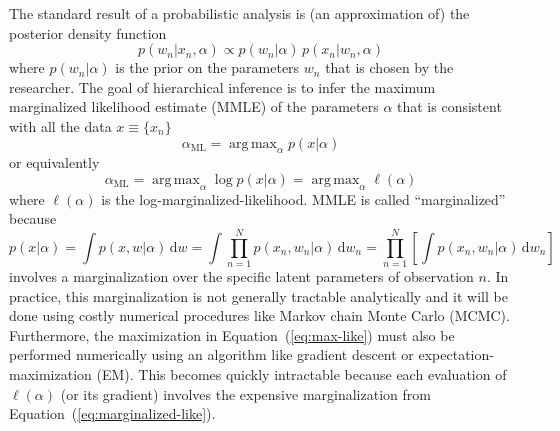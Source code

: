 \documentclass[12pt,preprint]{aastex}
\newcommand{\Eq}[1]{Equation~(\ref{eq:#1})}
\newcommand{\eq}[1]{\Eq{#1}}
\newcommand{\eqlabel}[1]{\label{eq:#1}}
\newcommand{\dd}{\,\mathrm{d}}
\newcommand{\pr}[1]{p ( #1 )}
\DeclareMathOperator*{\argmax}{arg\,max}
\begin{document}
The standard result of a probabilistic analysis is (an approximation of) the
posterior density function
\begin{equation}
    \pr{w_n | x_n, \alpha} \propto \pr{w_n | \alpha} \, \pr{x_n | w_n, \alpha}
\end{equation}
where $\pr{w_n | \alpha}$ is the prior on the parameters $w_n$ that is chosen
by the researcher. The goal of hierarchical inference is to infer the
maximum marginalized likelihood estimate (MMLE) of the parameters $\alpha$
that is consistent with all the data $x \equiv \{ x_n \}$
\begin{equation}
    \alpha_\mathrm{ML} = \argmax_\alpha \pr{x | \alpha}
\end{equation}
or equivalently
\begin{equation} \eqlabel{max-like}
    \alpha_\mathrm{ML} = \argmax_\alpha \log \pr{x | \alpha}
        = \argmax_\alpha \ell (\alpha)
\end{equation}
where $\ell (\alpha)$ is the log-marginalized-likelihood. MMLE is called
``marginalized'' because
\begin{equation} \eqlabel{marginalized-like}
    \pr{x | \alpha} = \int \pr{x, w | \alpha} \dd w
        = \int \prod_{n = 1} ^N  \pr{x_n, w_n | \alpha} \dd w_n
        = \prod_{n = 1} ^N \left [ \int \pr{x_n, w_n | \alpha} \dd w_n
            \right ]
\end{equation}
involves a marginalization over the specific latent parameters of observation
$n$. In practice, this marginalization is not generally tractable
analytically and it will be done using costly numerical procedures like
Markov chain Monte Carlo (MCMC). Furthermore, the maximization in
\eq{max-like} must also be performed numerically using an algorithm like
gradient descent or expectation-maximization (EM). This becomes quickly
intractable because each evaluation of $\ell (\alpha)$ (or its gradient)
involves the expensive marginalization from \eq{marginalized-like}.
\end{document}
